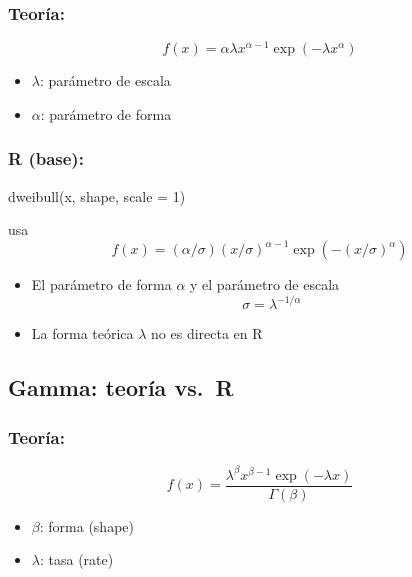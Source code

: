 \documentclass[
  letterpaper,
  DIV=11,
  numbers=noendperiod]{scrartcl}
\newenvironment{Shaded}{\begin{snugshade}}{\end{snugshade}}
\newcommand{\AttributeTok}[1]{\textcolor[rgb]{0.40,0.45,0.13}{#1}}
\newcommand{\DecValTok}[1]{\textcolor[rgb]{0.68,0.00,0.00}{#1}}
\newcommand{\FunctionTok}[1]{\textcolor[rgb]{0.28,0.35,0.67}{#1}}
\newcommand{\NormalTok}[1]{\textcolor[rgb]{0.00,0.23,0.31}{#1}}
\providecommand{\tightlist}{%
  \setlength{\itemsep}{0pt}\setlength{\parskip}{0pt}}
\begin{document}
\subsubsection{\texorpdfstring{\textbf{Teoría}:}{Teoría:}}\label{teoruxeda}

\[
f(x) = \alpha \lambda x^{\alpha - 1} \exp(-\lambda x^\alpha)
\]

\begin{itemize}
\tightlist
\item
  \(\lambda\): parámetro de escala
\item
  \(\alpha\): parámetro de forma
\end{itemize}

\subsubsection{\texorpdfstring{\textbf{R
(base)}:}{R (base):}}\label{r-base}

\begin{Shaded}
\begin{Highlighting}[]
\FunctionTok{dweibull}\NormalTok{(x, shape, }\AttributeTok{scale =} \DecValTok{1}\NormalTok{)}
\end{Highlighting}
\end{Shaded}

usa \[
f(x) = (\alpha /\sigma)  (x/\sigma)^{\alpha - 1} \exp(- (x/\sigma)^\alpha)
\]

\begin{itemize}
\tightlist
\item
  El parámetro de forma \(\alpha\) y el parámetro de escala
  \[\sigma=\lambda^{-1/\alpha}\]
\item
  La forma teórica \(\lambda\) no es directa en R
\end{itemize}

\subsection{Gamma: teoría vs.~R}\label{gamma-teoruxeda-vs.-r}

\subsubsection{\texorpdfstring{\textbf{Teoría}:}{Teoría:}}\label{teoruxeda-1}

\[
f(x) = \frac{\lambda^\beta x^{\beta - 1} \exp(-\lambda x)}{\Gamma(\beta)}
\]

\begin{itemize}
\tightlist
\item
  \(\beta\): forma (shape)
\item
  \(\lambda\): tasa (rate)
\end{itemize}
\end{document}
